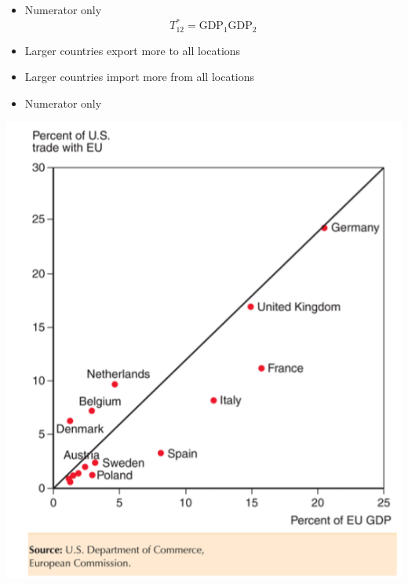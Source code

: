 \documentclass[ignorenonframetext,]{beamer}
\begin{document}
\begin{frame}
   
    \begin{itemize}
        \item Numerator only
        \begin{equation*}
            T^*_{12} = \mbox{GDP}_1 \mbox{GDP}_2
        \end{equation*}
        \item Larger countries export more to all locations
        \item Larger countries import more from all locations
    \end{itemize}

\end{frame}

\begin{frame}
   
    \begin{itemize}
        \item Numerator only
    \end{itemize}
    \includegraphics[scale=0.40]{gravity_numerator_fit.png}

\end{frame}
\end{document}
